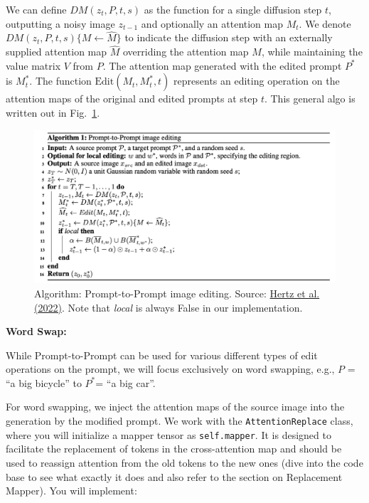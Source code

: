 \documentclass[11pt,addpoints,answers]{exam}
\begin{document}
\begin{questions}
We can define $DM(z_t, P, t, s)$ as the function for a single diffusion step $t$, outputting a noisy image $z_{t-1}$ and optionally an attention map $M_t$. We denote $DM(z_t, P, t, s)\{M \leftarrow \hat{M}\}$ to indicate the diffusion step with an externally supplied attention map $\hat{M}$ overriding the attention map \( M \), while maintaining the value matrix $V$ from $P$. The attention map generated with the edited prompt $P^*$ is $M_t^*$. The function $\text{Edit}(M_t, M_t^*, t)$ represents an editing operation on the attention maps of the original and edited prompts at step $t$. This general algo is written out in Fig.~\ref{fig:algo}.

    \begin{figure}[h!]
        \centering
        \includegraphics[width=.9\linewidth]{fig/algo.png}
        \caption{Algorithm: Prompt-to-Prompt image editing. Source: \href{https://arxiv.org/pdf/2208.01626.pdf}{Hertz et al. (2022)}. Note that \textit{local} is always False in our implementation. }
        \label{fig:algo}
    \end{figure}

\textbf{Word Swap:} 

While Prompt-to-Prompt can be used for various different types of edit operations on the prompt, we will focus exclusively on word swapping, e.g., \( P\) = “a
big bicycle” to \( P^* \)= “a big car”.

For word swapping, we inject the attention maps of the source image into the generation by the modified prompt. We work with the \lstinline{AttentionReplace} class, where you will initialize a mapper tensor as \lstinline{self.mapper}. It is designed to facilitate the replacement of tokens in the cross-attention map and should be used to reassign attention from the old tokens to the new ones (dive into the code base to see what exactly it does and also refer to the section on Replacement Mapper). You will implement:


\end{questions}
\end{document}
